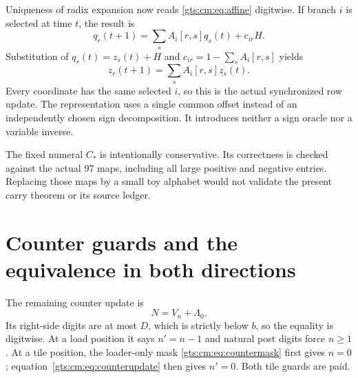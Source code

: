 \documentclass[11pt,letterpaper]{article}
\theoremstyle{definition}
\theoremstyle{remark}
\begin{document}
Uniqueness of radix expansion now reads \eqref{gts:cm:eq:affine} digitwise. If branch $i$ is selected at time $t$, the result is
\begin{equation}\label{gts:cm:eq:digitupdate}
 q_r(t+1)=\sum_s A_i[r,s]q_s(t)+c_{ir}H.
\end{equation}
Substitution of $q_s(t)=z_s(t)+H$ and $c_{ir}=1-\sum_sA_i[r,s]$ yields
\[
 z_r(t+1)=\sum_sA_i[r,s]z_s(t).
\]
Every coordinate has the same selected $i$, so this is the actual synchronized row update. The representation uses a single common offset instead of an independently chosen sign decomposition. It introduces neither a sign oracle nor a variable inverse.

The fixed numeral $C_*$ is intentionally conservative. Its correctness is checked against the actual 97 maps, including all large positive and negative entries. Replacing those maps by a small toy alphabet would not validate the present carry theorem or its source ledger.

\section{Counter guards and the equivalence in both directions}
\label{gts:cm:sec:equivalence}
The remaining counter update is
\begin{equation}\label{gts:cm:eq:counterupdate}
 N=V_n+\Lambda_0.
\end{equation}
Its right-side digits are at most $D$, which is strictly below $b$, so the equality is digitwise. At a load position it says $n'=n-1$ and natural post digits force $n\ge1$. At a tile position, the loader-only mask \eqref{gts:cm:eq:countermask} first gives $n=0$; equation~\eqref{gts:cm:eq:counterupdate} then gives $n'=0$. Both tile guards are paid.
\end{document}
